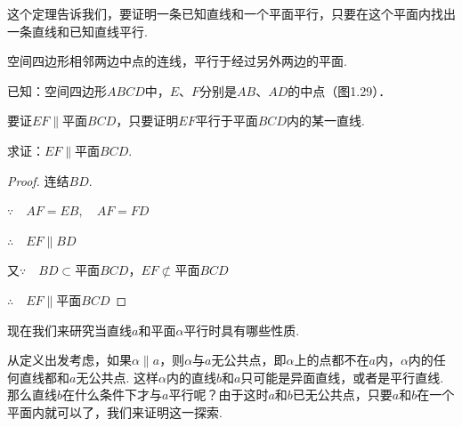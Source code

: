 这个定理告诉我们，要证明一条已知直线和一个平面平行，只要在这个平面内找出一条直线和已知直线平行.



\begin{example}
    空间四边形相邻两边中点的连线，平行于经过另外两边的平面.

已知：空间四边形$ABCD$中，$E$、$F$分别是$AB$、$AD$的中点（图1.29）．
\end{example}

\begin{analyze}
要证$EF\parallel$平面$BCD$，只要证明$EF$平行于平面$BCD$内的某一直线.

求证：$EF\parallel$平面$BCD$.
\end{analyze}

\noindent
\begin{minipage}{.45\textwidth}
\CTEXindent
\begin{proof}
连结$BD$.

$\because\quad AF=EB, \quad AF=FD$

$\therefore\quad EF\parallel BD$

又$\because\quad BD\subset$平面$BCD$，$EF\not\subset$平面$BCD$

$\therefore\quad EF\parallel $平面$BCD$
\end{proof}
\end{minipage}
\hfill
\begin{minipage}{.45\textwidth}
\centering
{}
\end{minipage}


现在我们来研究当直线$a$和平面$\alpha$平行时具有哪些性质.

从定义出发考虑，如果$\alpha\parallel a$，则$\alpha$与$a$无公共点，即$\alpha$上的点都不在$a$内，$\alpha$内的任何直线都和$a$无公共点. 这样$\alpha$内的直线$b$和$a$只可能是异面直线，或者是平行直线. 那么直线$b$在什么条件下才与$a$平行呢？由于这时$a$和$b$已无公共点，只要$a$和$b$在一个平面内就可以了，我们来证明这一探索.

